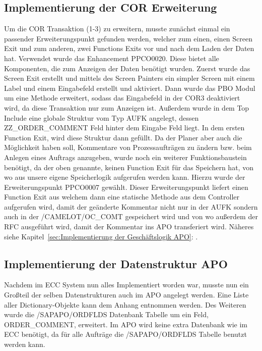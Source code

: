 \subsection{Implementierung der COR Erweiterung}
\label{sec:Implementierung der COR Erweiterung}   
Um die COR Transaktion (1-3) zu erweitern, musste zunächst einmal ein passender Erweiterungspunkt gefunden werden, welcher zum einen, einen Screen Exit und zum anderen, zwei Functions Exits vor und nach dem Laden der Daten hat. Verwendet wurde das Enhancement PPCO0020. Diese bietet alle Komponenten, die zum Anzeigen der Daten benötigt wurden. Zuerst wurde das Screen Exit erstellt und mittels des Screen Painters ein simpler Screen mit einem Label und einem Eingabefeld erstellt und aktiviert. Dann wurde das \ac{PBO} Modul um eine Methode erweitert, sodass das Eingabefeld in der COR3 deaktiviert wird, da diese Transaktion nur zum Anzeigen ist. Außerdem wurde in dem Top Include eine globale Struktur vom Typ AUFK angelegt, dessen ZZ\_ORDER\_COMMENT Feld hinter dem Eingabe Feld liegt. In dem ersten Function Exit, wird diese Struktur dann gefüllt. Da der Planer aber auch die Möglichkeit haben soll, Kommentare von Prozessaufträgen zu ändern bzw. beim Anlegen eines Auftrags anzugeben, wurde noch ein weiterer Funktionsbaustein benötigt, da der oben genannte, keinen Function Exit für das Speichern hat, von wo aus unsere eigene Speicherlogik aufgerufen werden kann. Hierzu wurde der Erweiterungspunkt PPCO0007 gewählt. Dieser Erweiterungspunkt liefert einen Function Exit aus welchem dann eine statische Methode aus dem Controller aufgerufen wird, damit der geänderte Kommentar nicht nur in der AUFK sondern auch in der /CAMELOT/OC\_COMT gespeichert wird und von wo außerdem der \ac{RFC} ausgeführt wird, damit der Kommentar ins \ac{APO} transferiert wird. Näheres siehe Kapitel~\ref{sec:Implementierung der Geschäftslogik APO}: .

\subsection{Implementierung der Datenstruktur APO}
\label{sec:Implementierung der Datenstruktur APO} 
Nachdem im \ac{ECC} System nun alles Implementiert worden war, musste nun ein Großteil der selben Datenstrukturen auch im \ac{APO} angelegt werden. Eine Liste aller Dictionary-Objekte kann dem Anhang entnommen werden. Des Weiteren wurde die /SAPAPO/ORDFLDS Datenbank Tabelle um ein Feld, ORDER\_COMMENT, erweitert. Im \ac{APO} wird keine extra Datenbank wie im \ac{ECC} benötigt, da für alle Aufträge die /SAPAPO/ORDFLDS Tabelle benutzt werden kann.

